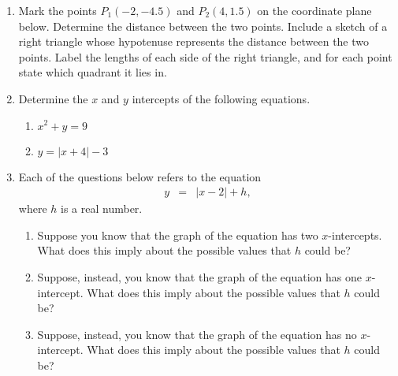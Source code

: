 \begin{enumerate}

\item Mark the points $P_1(-2,-4.5)$ and $P_2(4,1.5)$ on the
  coordinate plane below. Determine the distance between the two
  points.  Include a sketch of a right triangle whose hypotenuse
  represents the distance between the two points. Label the lengths of
  each side of the right triangle, and for each point state which
  quadrant it lies in.



\newpage


\item Determine the $x$ and $y$ intercepts of the following equations.
\begin{enumerate}
\item $x^2+y=9$
  \vfill
\item $y=|x+4|-3$
  \vfill
\end{enumerate}

\item Each of the questions below refers to the equation
  \begin{eqnarray*}
    y & = & |x-2| + h,
  \end{eqnarray*}
  where $h$ is a real number.
  \begin{enumerate}
  \item Suppose you know that the graph of the equation has two
    $x$-intercepts. What does this imply about the possible values
    that $h$ could be?
    \vfill
  \item Suppose, instead, you know that the graph of the equation has
    one $x$-intercept. What does this imply about the possible values
    that $h$ could be?
    \vfill
  \item Suppose, instead, you know that the graph of the equation has no
    $x$-intercept. What does this imply about the possible values
    that $h$ could be?
    \vfill
  \end{enumerate}


\end{enumerate}

